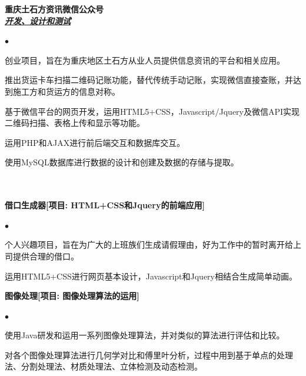 \documentclass[UTF8]{ctexart}
\newcommand{\lineunder}{\vspace*{-8pt} \\
\hspace*{-18pt} \hrulefill \\}
\newcommand{\header}[1]{\large \vspace*{12pt}{\Large \hspace*{-15pt}\vspace*{6pt} \textsc{#1}} \vspace*{-6pt} \lineunder}
\newcommand{\seconder}[1]{\vspace*{12pt}{\Large \hspace*{-15pt}\vspace*{6pt} \textsc{#1}} \vspace*{-6pt} \lineunder}
\newcommand{\website}[3]{{\normalsize \textbf{#1}\\
\underline{\textbf{\emph{#3}}}\\
}}
\newcommand{\courses}[1]{\vspace*{12pt}\normalsize \textbf{#1}\\
}    %
\newenvironment{achievements}{
\begin{list}
        {$\bullet$}{\topsep 0pt
        \itemsep 0pt}}{\vspace*{4pt}
\end{list}
}
\newenvironment{courseworks}{
\begin{list}
        {$\bullet$}{\topsep 0pt
        \itemsep -2pt}}{\vspace*{4pt}
\end{list}
}
\begin{document}
\website{\textbf{重庆土石方资讯微信公众号}}{}{开发、设计和测试}
\begin{achievements}
    \item 创业项目，旨在为重庆地区土石方从业人员提供信息资讯的平台和相关应用。
    \item 推出货运卡车扫描二维码记账功能，替代传统手动记账，实现微信直接查账，并达到施工方和货运方的信息对称。
    \item 基于微信平台的网页开发，运用HTML5+CSS，Javascript/Jquery及微信API实现二维码扫描、表格上传和显示等功能。
    \item 运用PHP和AJAX进行前后端交互和数据库交互。
    \item 使用MySQL数据库进行数据的设计和创建及数据的存储与提取。
\end{achievements}


\seconder{其他项目}

\courses{借口生成器[项目: HTML+CSS和Jquery的前端应用]}
\begin{courseworks}
    \item	个人兴趣项目，旨在为广大的上班族们生成请假理由，好为工作中的暂时离开给上司提供合理的借口。
    \item	运用HTML5+CSS进行网页基本设计，Javascript和Jquery相结合生成简单动画。
\end{courseworks}

\courses{图像处理[项目: 图像处理算法的运用]}
\begin{courseworks}
    \item	使用Java研发和运用一系列图像处理算法，并对类似的算法进行评估和比较。
    \item	对各个图像处理算法进行几何学对比和傅里叶分析，过程中用到基于单点的处理法、分割处理法、材质处理法、立体检测及动态检测。
\end{courseworks}
\end{document}

